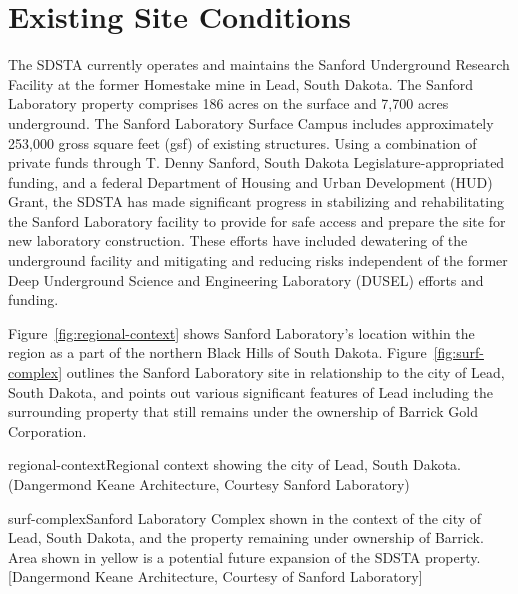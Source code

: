 \chapter{Existing Site Conditions}
\label{ch:fscf-site-cond}


The SDSTA currently operates and maintains the Sanford Underground Research Facility at the former Homestake mine in Lead, South Dakota. The Sanford Laboratory property comprises 186 acres on the surface and 7,700 acres underground. The Sanford Laboratory Surface Campus includes approximately 253,000 gross square feet (gsf) of existing structures. Using a combination of private funds through T. Denny Sanford, South Dakota Legislature-appropriated funding, and a federal Department of Housing and Urban Development (HUD) Grant, the SDSTA has made significant progress in stabilizing and rehabilitating the Sanford Laboratory facility to provide for safe access and prepare the site for new laboratory construction. These efforts have included dewatering of the underground facility and mitigating and reducing risks independent of the former Deep Underground Science and Engineering Laboratory (DUSEL) efforts and funding.

Figure~\ref{fig:regional-context} shows Sanford Laboratory's location within the region as a part of the northern Black Hills of South Dakota. Figure~\ref{fig:surf-complex} outlines the Sanford Laboratory site in relationship to the city of Lead, South Dakota, and points out various significant features of Lead including the surrounding property that still remains under the ownership of Barrick Gold Corporation.

\begin{cdrfigure}{regional-context}{Regional context showing the city of Lead, South Dakota. (Dangermond Keane Architecture, Courtesy Sanford Laboratory)}
\end{cdrfigure}


\begin{cdrfigure}{surf-complex}{Sanford Laboratory Complex shown in the context of the city of Lead, South Dakota, and the property remaining under ownership of Barrick. Area shown in yellow is a potential future expansion of the SDSTA property. [Dangermond Keane Architecture, Courtesy of Sanford Laboratory]}
\end{cdrfigure}



